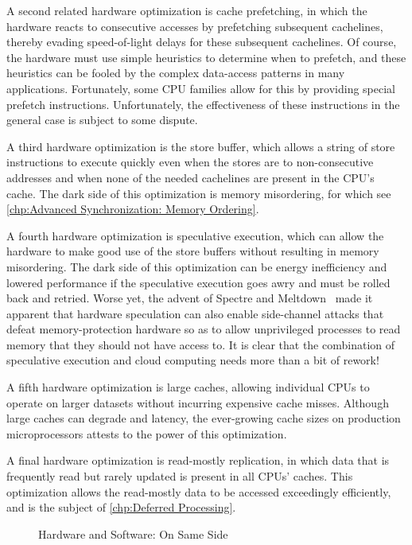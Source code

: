 A second related hardware optimization is cache prefetching, in which
the hardware reacts to consecutive accesses by prefetching subsequent
cachelines, thereby evading speed-of-light delays for these
subsequent cachelines.
Of course, the hardware must use simple heuristics to determine when
to prefetch, and these heuristics can be fooled by the complex data-access
patterns in many applications.
Fortunately, some CPU families allow for this by providing special
prefetch instructions.
Unfortunately, the effectiveness of these instructions in the general
case is subject to some dispute.

A third hardware optimization is the store buffer, which allows a string
of store instructions to execute quickly even when the stores are to
non-consecutive addresses and when none of the needed cachelines are
present in the CPU's cache.
The dark side of this optimization is memory misordering, for which see
\cref{chp:Advanced Synchronization: Memory Ordering}.

A fourth hardware optimization is speculative execution, which can
allow the hardware to make good use of the store buffers without
resulting in memory misordering.
The dark side of this optimization can be energy inefficiency and
lowered performance if the speculative execution goes awry and must
be rolled back and retried.
Worse yet, the advent of
Spectre and Meltdown~\cite{JannHorn2018MeltdownSpectre}
made it apparent that hardware speculation can also enable side-channel
attacks that defeat memory-protection hardware so as to allow unprivileged
processes to read memory that they should not have access to.
It is clear that the combination of speculative execution and cloud
computing needs more than a bit of rework!

A fifth hardware optimization is large caches, allowing individual
CPUs to operate on larger datasets without incurring expensive cache
misses.
Although large caches can degrade  and 
{latency}, the ever-growing cache sizes on production microprocessors
attests to the power of this optimization.

A final hardware optimization is read-mostly replication, in which
data that is frequently read but rarely updated is present in all
CPUs' caches.
This optimization allows the read-mostly data to be accessed
exceedingly efficiently, and is the subject of
\cref{chp:Deferred Processing}.

\begin{figure}
\centering
{}
\caption{Hardware and Software:
				On Same Side}
\end{figure}

